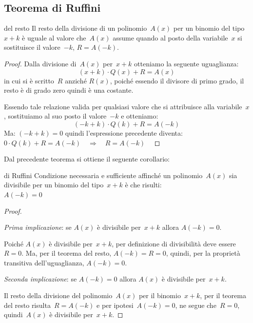 \subsection{Teorema di Ruffini}
\label{subsec:divpol_teorema_ruffini}

\begin{teorema}{del resto}{}
Il resto della divisione di un polinomio~\(A(x)\) per un
binomio del tipo~\(x+k\) è uguale al valore che~\(A(x)\) assume quando
al posto della variabile~\(x\) si sostituisce il valore~\(-k\), \(R=A(-k)\).
\end{teorema}

\begin{proof}{}{}
Dalla divisione di~\(A(x)\) per~\(x+k\) otteniamo la seguente
uguaglianza:
\[(x+k)\cdot Q(x)+R=A(x)\]
in cui si è scritto~\(R\) anziché \(R(x)\), poiché essendo il divisore di 
primo grado, il resto è di grado zero quindi è una costante.

Essendo tale relazione valida per qualsiasi valore che si attribuisce
alla variabile~\(x\), sostituiamo al suo posto il valore~\(-k\) e otteniamo:
\[(-k+k) \cdot Q(k)+R=A(-k)\]
Ma: \((-k+k)=0\) quindi l'espressione precedente diventa:\\[.5em]
\phantom{.}\hfill 
\(0 \cdot Q(k)+R=A(-k) \quad \Longrightarrow \quad R=A(-k)\) \hfill ~
\end{proof}

Dal precedente teorema si ottiene il seguente corollario:

\begin{teorema}{di Ruffini}{}
Condizione necessaria e sufficiente affinché un polinomio~\(A(x)\) 
sia divisibile per un binomio del tipo~\(x+k\) è
che risulti: \\
\phantom{.}\hfill \(A(-k)=0\) \hfill ~
\end{teorema}

\begin{proof}{}{}
~

\emph{Prima implicazione}: \quad se \(A(x)\) è divisibile 
per~\(x+k\) \quad allora \quad \(A(-k)=0\).

Poiché \(A(x)\) è divisibile per~\(x+k\), per definizione di divisibilità 
deve essere~\(R=0\). 
Ma, per il teorema del resto, \(A(-k)=R=0\), 
quindi, per la proprietà transitiva dell'uguaglianza, \(A(-k)=0\).

\noindent \emph{Seconda implicazione}: \quad se \(A(-k)=0\) \quad 
allora \quad \(A(x)\) è divisibile per~\(x+k\).

Il resto della divisione del polinomio~\(A(x)\) per il binomio~\(x+k\),
per il teorema del resto risulta~\(R=A(-k)\) e per ipotesi~\(A(-k)=0\),
ne segue che~\(R=0\), quindi~\(A(x)\) è divisibile per~\(x+k\).
\end{proof}

